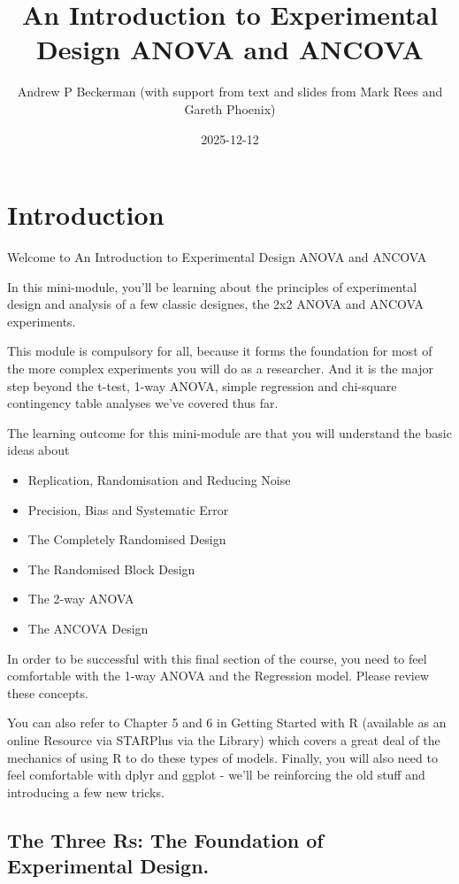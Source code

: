 \documentclass[
]{book}
\title{An Introduction to Experimental Design ANOVA and ANCOVA}
\author{Andrew P Beckerman (with support from text and slides from Mark Rees and Gareth Phoenix)}
\date{2025-12-12}
\providecommand{\tightlist}{%
  \setlength{\itemsep}{0pt}\setlength{\parskip}{0pt}}
\begin{document}
\maketitle

{
\setcounter{tocdepth}{1}
\tableofcontents
}
\chapter{Introduction}\label{introduction}

Welcome to An Introduction to Experimental Design ANOVA and ANCOVA

In this mini-module, you'll be learning about the principles of experimental design and analysis of a few classic designes, the 2x2 ANOVA and ANCOVA experiments.

This module is compulsory for all, because it forms the foundation for most of the more complex experiments you will do as a researcher. And it is the major step beyond the t-test, 1-way ANOVA, simple regression and chi-square contingency table analyses we've covered thus far.

The learning outcome for this mini-module are that you will understand the basic ideas about

\begin{itemize}
\tightlist
\item
  Replication, Randomisation and Reducing Noise
\item
  Precision, Bias and Systematic Error
\item
  The Completely Randomised Design
\item
  The Randomised Block Design
\item
  The 2-way ANOVA
\item
  The ANCOVA Design
\end{itemize}

In order to be successful with this final section of the course, you need to feel comfortable with the 1-way ANOVA and the Regression model. Please review these concepts.

You can also refer to Chapter 5 and 6 in Getting Started with R (available as an online Resource via STARPlus via the Library) which covers a great deal of the mechanics of using R to do these types of models. Finally, you will also need to feel comfortable with dplyr and ggplot - we'll be reinforcing the old stuff and introducing a few new tricks.

\section{The Three Rs: The Foundation of Experimental Design.}\label{the-three-rs-the-foundation-of-experimental-design.}
\end{document}
